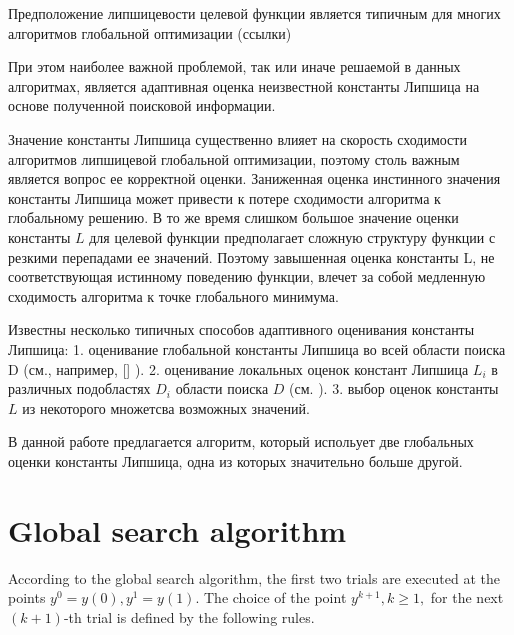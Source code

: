 \documentclass[runningheads]{llncs}
\begin{document}
Предположение липшицевости целевой функции является типичным для многих алгоритмов глобальной оптимизации (ссылки)


При этом наиболее важной проблемой, так или иначе решаемой в данных алгоритмах, является адаптивная оценка неизвестной константы Липшица на основе полученной поисковой информации. 

Значение константы Липшица существенно влияет на скорость сходимости алгоритмов липшицевой глобальной оптимизации, поэтому столь важным является вопрос ее корректной оценки. Заниженная оценка инстинного значения константы Липшица может привести к потере сходимости алгоритма к глобальному решению. В то же время слишком большое значение оценки константы $L$ для целевой функции предполагает сложную структуру функции с резкими перепадами ее значений. Поэтому завышенная оценка константы L, не соответствующая истинному поведению функции, влечет за собой медленную сходимость алгоритма к точке глобального минимума. 

Известны несколько типичных способов адаптивного оценивания константы Липшица:
1. оценивание глобальной константы Липшица во всей области поиска D (см., например, [] ). 
2. оценивание локальных оценок констант Липшица $L_i$ в различных подобластях $D_i$ области поиска $D$ (см. ). 
3. выбор оценок константы $L$ из некоторого множетсва возможных значений.


В данной работе предлагается алгоритм, который испольует две глобальных оценки константы Липшица, одна из которых значительно больше другой.

 


\section{Global search algorithm}




According to the global search algorithm, the first two trials are executed at 
the points $y^0=y(0), y^1=y(1)$. The choice of the point $y^{k+1},k\geq 1,$  
for the next $(k+1)$-th trial is defined by the following rules.
\end{document}
